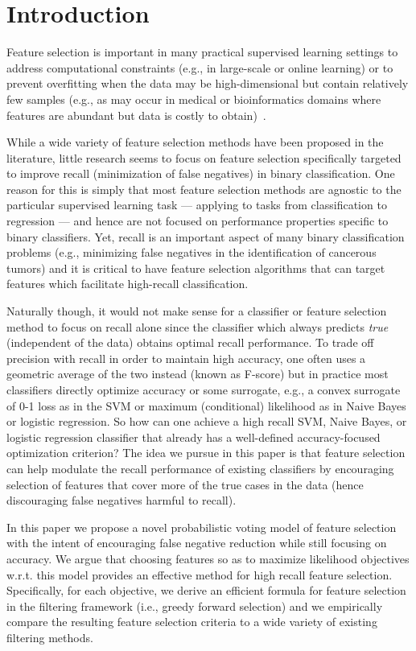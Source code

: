 \section{Introduction}

Feature selection is important in many practical supervised learning
settings to address computational constraints (e.g., in large-scale or
online learning) or to prevent overfitting when the data may be
high-dimensional but contain relatively few samples (e.g., as may
occur in medical or bioinformatics domains where features are abundant
but data is costly to obtain)~\cite{guyon_jmlr03}.

While a wide variety of feature selection methods have been proposed
in the literature, little research seems to focus on feature selection
specifically targeted to improve recall (minimization of false
negatives) in binary classification.  One reason for this is simply
that most feature selection methods are agnostic to the particular
supervised learning task --- applying to tasks from classification to
regression --- and hence are not focused on performance properties
specific to binary classifiers.  Yet, recall is an important aspect of
many binary classification problems (e.g., minimizing false negatives
in the identification of cancerous tumors) and it is critical to have
feature selection algorithms that can target features which facilitate
high-recall classification.

Naturally though, it would not make sense for a classifier or feature
selection method to focus on recall alone since the classifier which
always predicts \emph{true} (independent of the data) obtains optimal
recall performance.  To trade off precision with recall in order to
maintain high accuracy, one often uses a geometric average of the two
instead (known as F-score) but in practice most classifiers directly
optimize accuracy or some surrogate, e.g., a convex surrogate of 0-1
loss as in the SVM or maximum (conditional) likelihood as in Naive
Bayes or logistic regression.  So how can one achieve a high recall
SVM, Naive Bayes, or logistic regression classifier that already has a
well-defined accuracy-focused optimization criterion?  The idea we
pursue in this paper is that feature selection can help modulate the
recall performance of existing classifiers by encouraging selection of
features that cover more of the true cases in the data (hence
discouraging false negatives harmful to recall).

In this paper we propose a novel probabilistic voting model of feature
selection with the intent of encouraging false negative reduction
while still focusing on accuracy.  We argue that choosing features so
as to maximize likelihood objectives w.r.t. this model provides an
effective method for high recall feature selection.  Specifically, for
each objective, we derive an efficient formula for feature selection
in the filtering framework (i.e., greedy forward selection) and we
empirically compare the resulting feature selection criteria to a wide
variety of existing filtering methods.

